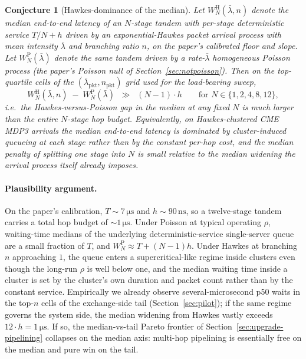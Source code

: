 \documentclass[11pt]{article}
\newtheorem{conjecture}{Conjecture}
\begin{document}
\begin{conjecture}[Hawkes-dominance of the median]
\label{conj:hawkes-median}
Let $W_N^{\mathrm{H}}(\bar\lambda, n)$ denote the median end-to-end latency of an $N$-stage tandem with per-stage deterministic service $T/N + h$ driven by an exponential-Hawkes packet arrival process with mean intensity $\bar\lambda$ and branching ratio $n$, on the paper's calibrated floor and slope. Let $W_N^{\mathrm{P}}(\bar\lambda)$ denote the same tandem driven by a rate-$\bar\lambda$ homogeneous Poisson process (the paper's Poisson null of Section~\ref{sec:notpoisson}). Then on the top-quartile cells of the $(\bar\lambda_{\mathrm{pkt}}, n_{\mathrm{pkt}})$ grid used for the load-bearing sweep,
$$
W_N^{\mathrm{H}}(\bar\lambda, n) \;-\; W_N^{\mathrm{P}}(\bar\lambda) \;\;\gg\;\; (N-1)\cdot h
\qquad\text{for } N \in \{1, 2, 4, 8, 12\},
$$
i.e.\ the Hawkes-versus-Poisson gap in the median at any fixed $N$ is much larger than the entire $N$-stage hop budget. Equivalently, on Hawkes-clustered CME MDP3 arrivals the median end-to-end latency is dominated by cluster-induced queueing at each stage rather than by the constant per-hop cost, and the median penalty of splitting one stage into $N$ is small relative to the median widening the arrival process itself already imposes.
\end{conjecture}

\paragraph{Plausibility argument.} On the paper's calibration, $T \sim 7\,\si{\micro\second}$ and $h \sim 90\,\mathrm{ns}$, so a twelve-stage tandem carries a total hop budget of $\sim 1\,\si{\micro\second}$. Under Poisson at typical operating $\rho$, waiting-time medians of the underlying deterministic-service single-server queue are a small fraction of $T$, and $W_N^{\mathrm{P}} \approx T + (N-1)h$. Under Hawkes at branching $n$ approaching $1$, the queue enters a supercritical-like regime inside clusters even though the long-run $\rho$ is well below one, and the median waiting time inside a cluster is set by the cluster's own duration and packet count rather than by the constant service. Empirically we already observe several-microsecond p50 waits in the top-$n$ cells of the exchange-side tail (Section~\ref{sec:pilot}); if the same regime governs the system side, the median widening from Hawkes vastly exceeds $12 \cdot h = 1\,\si{\micro\second}$. If so, the median-vs-tail Pareto frontier of Section~\ref{sec:upgrade-pipelining} collapses on the median axis: multi-hop pipelining is essentially free on the median and pure win on the tail.
\end{document}
